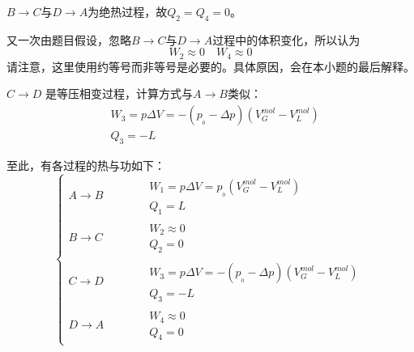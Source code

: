 \begin{solution}
    $B\rightarrow C$与$D\rightarrow A$为绝热过程，故$Q_2 = Q_4 = 0$。

    又一次由题目假设，忽略$B\rightarrow C$与$D\rightarrow A$过程中的体积变化，所以认为
    \[W_2\approx 0\quad W_4\approx 0\]
    请注意，这里使用约等号而非等号是必要的。具体原因，会在本小题的最后解释。

    $C\rightarrow D$ 是等压相变过程，计算方式与$A\rightarrow B$类似：
    \begin{equation*}
        \begin{aligned}
             & W_3 = p\Delta V = -(p_{_0} - \Delta p)(V_{G}^{mol}-V_{L}^{mol}) \\
             & Q_3 = -L
        \end{aligned}
    \end{equation*}

    至此，有各过程的热与功如下：
    \[\left\{
        \begin{aligned}
            A\rightarrow B & \qquad\begin{aligned}
                                        & W_1= p\Delta V = p_{_0}(V_{G}^{mol}-V_{L}^{mol}) \\
                                        & Q_1 = L
                                   \end{aligned}
            \\[1ex]
            B\rightarrow C & \qquad\begin{aligned}
                                        & W_2\approx 0 \\
                                        & Q_2 = 0
                                   \end{aligned}
            \\[1ex]
            C\rightarrow D & \qquad\begin{aligned}
                                        & W_3 = p\Delta V = -(p_{_0} - \Delta p)(V_{G}^{mol}-V_{L}^{mol}) \\
                                        & Q_3 = -L
                                   \end{aligned}
            \\[1ex]
            D\rightarrow A & \qquad\begin{aligned}
                                        & W_4\approx 0 \\
                                        & Q_4 = 0
                                   \end{aligned}
        \end{aligned}
        \right.\]


\end{solution}
